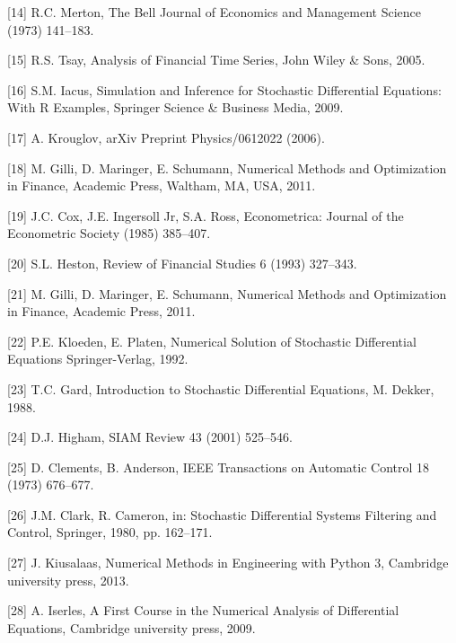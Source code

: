 \documentclass[12pt,twoside]{reedthesis}
\theoremstyle{definition}
\theoremstyle{definition}
\theoremstyle{remark}
\begin{document}
  \hypertarget{ref-merton1973theory}{}
  {[}14{]} R.C. Merton, The Bell Journal of Economics and Management
  Science (1973) 141--183.
  
  \hypertarget{ref-tsay2005analysis}{}
  {[}15{]} R.S. Tsay, Analysis of Financial Time Series, John Wiley \&
  Sons, 2005.
  
  \hypertarget{ref-iacus2009simulation}{}
  {[}16{]} S.M. Iacus, Simulation and Inference for Stochastic
  Differential Equations: With R Examples, Springer Science \& Business
  Media, 2009.
  
  \hypertarget{ref-krouglov2006intuitive}{}
  {[}17{]} A. Krouglov, arXiv Preprint Physics/0612022 (2006).
  
  \hypertarget{ref-nmof}{}
  {[}18{]} M. Gilli, D. Maringer, E. Schumann, Numerical Methods and
  Optimization in Finance, Academic Press, Waltham, MA, USA, 2011.
  
  \hypertarget{ref-cox1985theory}{}
  {[}19{]} J.C. Cox, J.E. Ingersoll Jr, S.A. Ross, Econometrica: Journal
  of the Econometric Society (1985) 385--407.
  
  \hypertarget{ref-heston1993closed}{}
  {[}20{]} S.L. Heston, Review of Financial Studies 6 (1993) 327--343.
  
  \hypertarget{ref-gilli_numerical_2011}{}
  {[}21{]} M. Gilli, D. Maringer, E. Schumann, Numerical Methods and
  Optimization in Finance, Academic Press, 2011.
  
  \hypertarget{ref-kloeden1992}{}
  {[}22{]} P.E. Kloeden, E. Platen, Numerical Solution of Stochastic
  Differential Equations Springer-Verlag, 1992.
  
  \hypertarget{ref-gard1988}{}
  {[}23{]} T.C. Gard, Introduction to Stochastic Differential Equations,
  M. Dekker, 1988.
  
  \hypertarget{ref-higham2001}{}
  {[}24{]} D.J. Higham, SIAM Review 43 (2001) 525--546.
  
  \hypertarget{ref-clements1973well}{}
  {[}25{]} D. Clements, B. Anderson, IEEE Transactions on Automatic
  Control 18 (1973) 676--677.
  
  \hypertarget{ref-clark1980maximum}{}
  {[}26{]} J.M. Clark, R. Cameron, in: Stochastic Differential Systems
  Filtering and Control, Springer, 1980, pp. 162--171.
  
  \hypertarget{ref-kiusalaas2013numerical}{}
  {[}27{]} J. Kiusalaas, Numerical Methods in Engineering with Python 3,
  Cambridge university press, 2013.
  
  \hypertarget{ref-iserles}{}
  {[}28{]} A. Iserles, A First Course in the Numerical Analysis of
  Differential Equations, Cambridge university press, 2009.
  
\end{document}

